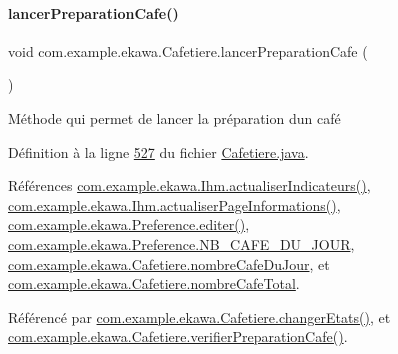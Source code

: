 \mbox{\label{classcom_1_1example_1_1ekawa_1_1_cafetiere_ac79907a8b3499bb9b2f50e31f8c904e8}} 
\paragraph{\texorpdfstring{lancer\+Preparation\+Cafe()}{lancerPreparationCafe()}}
{\footnotesize\ttfamily void com.\+example.\+ekawa.\+Cafetiere.\+lancer\+Preparation\+Cafe (\begin{DoxyParamCaption}{ }\end{DoxyParamCaption})\hspace{0.3cm}{\ttfamily [private]}}



Méthode qui permet de lancer la préparation d\textquotesingle{}un café 



Définition à la ligne \hyperlink{_cafetiere_8java_source_l00527}{527} du fichier \hyperlink{_cafetiere_8java_source}{Cafetiere.\+java}.



Références \hyperlink{_ihm_8java_source_l00855}{com.\+example.\+ekawa.\+Ihm.\+actualiser\+Indicateurs()}, \hyperlink{_ihm_8java_source_l00919}{com.\+example.\+ekawa.\+Ihm.\+actualiser\+Page\+Informations()}, \hyperlink{_preference_8java_source_l00100}{com.\+example.\+ekawa.\+Preference.\+editer()}, \hyperlink{_preference_8java_source_l00034}{com.\+example.\+ekawa.\+Preference.\+N\+B\+\_\+\+C\+A\+F\+E\+\_\+\+D\+U\+\_\+\+J\+O\+UR}, \hyperlink{_cafetiere_8java_source_l00096}{com.\+example.\+ekawa.\+Cafetiere.\+nombre\+Cafe\+Du\+Jour}, et \hyperlink{_cafetiere_8java_source_l00098}{com.\+example.\+ekawa.\+Cafetiere.\+nombre\+Cafe\+Total}.



Référencé par \hyperlink{_cafetiere_8java_source_l00463}{com.\+example.\+ekawa.\+Cafetiere.\+changer\+Etats()}, et \hyperlink{_cafetiere_8java_source_l00509}{com.\+example.\+ekawa.\+Cafetiere.\+verifier\+Preparation\+Cafe()}.


